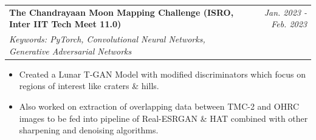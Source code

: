 \documentclass[a4paper,11pt]{article}
\makeatletter
\newcommand{\resumeProject}[4]{
\vspace{0.5mm}\item
    \begin{tabular*}{0.98\textwidth}[t]{l@{\extracolsep{\fill}}r}
        \textbf{#1} & \textit{\footnotesize{#3}} \\
        \footnotesize{\textit{#2}} & \footnotesize{#4}
    \end{tabular*}
    \vspace{-2.4mm}
}
\newcommand{\resumeItemListStart}{\begin{justify}\begin{itemize}[leftmargin=3ex, rightmargin=2ex, noitemsep,labelsep=1.2mm,itemsep=0mm]\small}
\newcommand{\resumeItemListEnd}{\end{itemize}\end{justify}\vspace{-2mm}}
\makeatother
\begin{document}
\resumeProject
{The Chandrayaan Moon Mapping Challenge (ISRO, Inter IIT Tech Meet 11.0)}
{Keywords: PyTorch, Convolutional Neural Networks, Generative Adversarial Networks}
{Jan. 2023 - Feb. 2023}
{\href{https://github.com/somnathjena2011/ISRO}{\faGithub}}
\resumeItemListStart
\item {Created a Lunar T-GAN Model with modified discriminators which focus on regions of interest like craters \& hills.}
\item {Also worked on extraction of overlapping data between TMC-2 and OHRC images to be fed into pipeline of Real-ESRGAN \& HAT combined with other sharpening and denoising algorithms.}
\resumeItemListEnd



\end{document}
